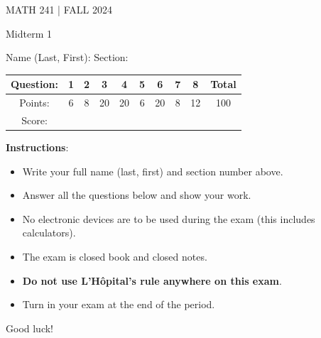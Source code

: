\documentclass{article}
\begin{document}
MATH 241 | FALL 2024

\vspace{1in}

\begin{center}
\LARGE{Midterm 1 }
\end{center}

\vspace{0.5in}

\begin{center}
Name (Last, First): \underline{\hspace{3in}} \qquad Section: \underline{\hspace{1in}}
\end{center}

\vspace{0.5in}

\begin{center}
\begin{tabular}{ |c|c|c|c|c|c|c|c|c|c| }
\hline
Question: & 1 & 2 & 3 & 4 & 5 & 6 & 7 & 8 & Total \\
\hline
Points: & 6 & 8 & 20 & 20 & 6 & 20 & 8 & 12 & 100 \\
\hline
Score: & \hspace{0.25in} & \hspace{0.25in} & \hspace{0.25in} & \hspace{0.25in} & \hspace{0.25in} & \hspace{0.25in} & \hspace{0.25in} & \hspace{0.25in} & {} \\
\hline
\end{tabular}
\end{center}

\vspace{0.5in}

\begin{large}
\textbf{Instructions}:

\begin{itemize}
\item Write your full name (last, first) and section number above.
\item Answer all the questions below and show your work.
\item No electronic devices are to be used during the exam (this includes calculators).
\item The exam is closed book and closed notes.
\item \textbf{Do not use L'H\^{o}pital's rule anywhere on this exam}.
\item Turn in your exam at the end of the period.
\end{itemize}

Good luck!
\end{large}
\end{document}
